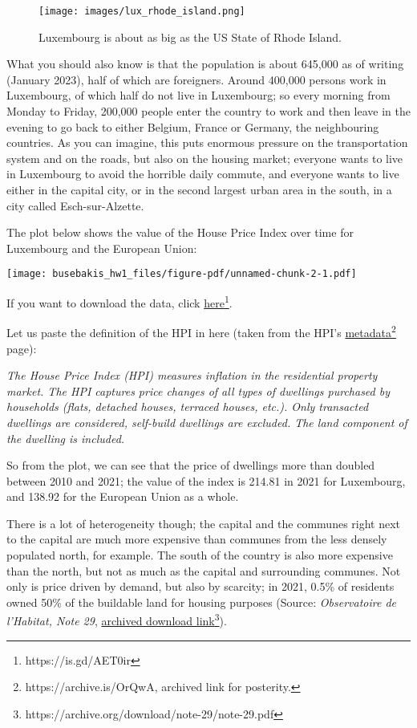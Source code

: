 \documentclass[
  letterpaper,
  DIV=11,
  numbers=noendperiod]{scrartcl}
\begin{document}
\begin{figure}

{\centering \texttt{[image: images/lux\_rhode\_island.png]}

}

\caption{Luxembourg is about as big as the US State of Rhode Island.}

\end{figure}

What you should also know is that the population is about 645,000 as of
writing (January 2023), half of which are foreigners. Around 400,000
persons work in Luxembourg, of which half do not live in Luxembourg; so
every morning from Monday to Friday, 200,000 people enter the country to
work and then leave in the evening to go back to either Belgium, France
or Germany, the neighbouring countries. As you can imagine, this puts
enormous pressure on the transportation system and on the roads, but
also on the housing market; everyone wants to live in Luxembourg to
avoid the horrible daily commute, and everyone wants to live either in
the capital city, or in the second largest urban area in the south, in a
city called Esch-sur-Alzette.

The plot below shows the value of the House Price Index over time for
Luxembourg and the European Union:

\texttt{[image: busebakis\_hw1\_files/figure-pdf/unnamed-chunk-2-1.pdf]}

If you want to download the data, click
\href{https://github.com/b-rodrigues/rap4all/raw/master/datasets/prc_hpi_a__custom_4705395_page_linear.csv.gz}{here}\footnote{https://is.gd/AET0ir}.

Let us paste the definition of the HPI in here (taken from the HPI's
\href{https://archive.is/OrQwA}{metadata}\footnote{https://archive.is/OrQwA,
  archived link for posterity.} page):

\emph{The House Price Index (HPI) measures inflation in the residential
property market. The HPI captures price changes of all types of
dwellings purchased by households (flats, detached houses, terraced
houses, etc.). Only transacted dwellings are considered, self-build
dwellings are excluded. The land component of the dwelling is included.}

So from the plot, we can see that the price of dwellings more than
doubled between 2010 and 2021; the value of the index is 214.81 in 2021
for Luxembourg, and 138.92 for the European Union as a whole.

There is a lot of heterogeneity though; the capital and the communes
right next to the capital are much more expensive than communes from the
less densely populated north, for example. The south of the country is
also more expensive than the north, but not as much as the capital and
surrounding communes. Not only is price driven by demand, but also by
scarcity; in 2021, 0.5\% of residents owned 50\% of the buildable land
for housing purposes (Source: \emph{Observatoire de l'Habitat, Note 29},
\href{https://archive.org/download/note-29/note-29.pdf}{archived
download link}\footnote{https://archive.org/download/note-29/note-29.pdf}).
\end{document}
